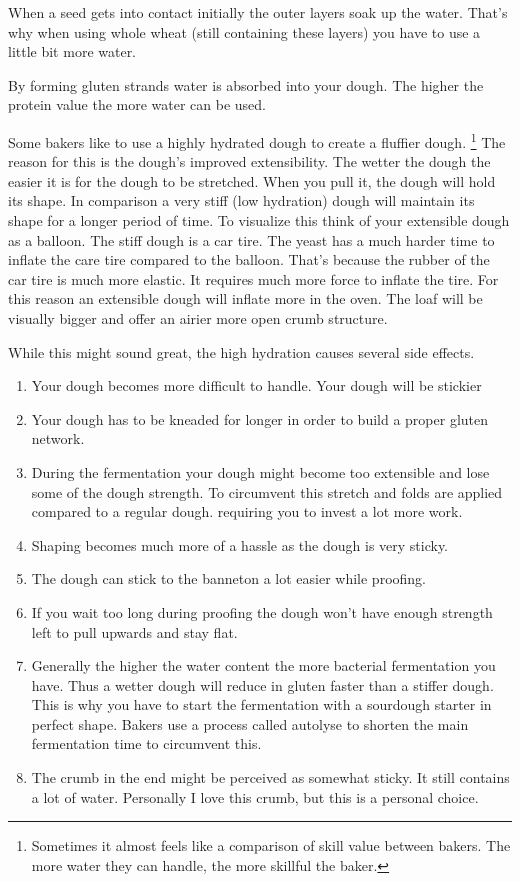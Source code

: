 When a seed gets into contact initially the outer layers soak up the water.
That's why when using whole wheat (still containing these layers) you have to
use a little bit more water.

By forming gluten strands water is absorbed into your dough. The higher the
protein value the more water can be used.

Some bakers like to use a highly hydrated dough to create a fluffier dough.
\footnote{Sometimes it almost feels like a comparison of skill value between bakers. The
more water they can handle, the more skillful the baker.} The reason for this
is the dough's improved extensibility. The wetter the dough the easier it is
for the dough to be stretched. When you pull it, the dough will hold its
shape. In comparison a very stiff (low hydration) dough will maintain its
shape for a longer period of time. To visualize this think of your extensible
dough as a balloon. The stiff dough is a car tire. The yeast has a much harder
time to inflate the care tire compared to the balloon. That's because the
rubber of the car tire is much more elastic. It requires much more force to
inflate the tire. For this reason an extensible dough will inflate more in the
oven. The loaf will be visually bigger and offer an airier more open crumb structure.

While this might sound great, the high hydration causes several side effects.

\begin{enumerate}
  \item Your dough becomes more difficult to handle. Your dough will be stickier
  \item Your dough has to be kneaded for longer in order to build a proper gluten
    network.
  \item During the fermentation your dough might become too extensible and lose
    some of the dough strength. To circumvent this stretch and folds are applied
    compared to a regular dough.
    requiring you to invest a lot more work.
  \item Shaping becomes much more of a hassle as the dough is very sticky.
  \item The dough can stick to the banneton a lot easier while proofing.
  \item If you wait too long during proofing the dough won't have enough strength
    left to pull upwards and stay flat.
  \item Generally the higher the water content the more bacterial fermentation you
    have. Thus a wetter dough will reduce in gluten faster than a stiffer dough.
    This is why you have to start the fermentation with a sourdough starter in
    perfect shape. Bakers use a process called autolyse to shorten the main
    fermentation time to circumvent this.
  \item The crumb in the end might be perceived as somewhat sticky. It still
    contains a lot of water. Personally I love this crumb, but this is a personal
    choice.
\end{enumerate}

